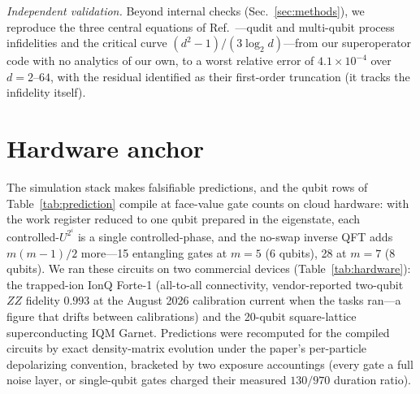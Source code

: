 \documentclass[aps,pra,reprint,superscriptaddress,nofootinbib,floatfix]{revtex4-2}
\begin{document}
\emph{Independent validation.} Beyond internal checks
(Sec.~\ref{sec:methods}), we reproduce the three central equations of
Ref.~\cite{jankovic2024}---qudit and multi-qubit process infidelities
and the critical curve $(d^2-1)/(3\log_2 d)$---from our superoperator
code with no analytics of our own, to a worst relative error of
$4.1\times10^{-4}$ over $d=2$--$64$, with the residual identified as
their first-order truncation (it tracks the infidelity itself).

\section{Hardware anchor}
\label{sec:hardware}

The simulation stack makes falsifiable predictions, and the qubit rows
of Table~\ref{tab:prediction} compile at face-value gate counts on
cloud hardware: with the work register reduced to one qubit prepared
in the eigenstate, each controlled-$U^{2^i}$ is a single
controlled-phase, and the no-swap inverse QFT adds $m(m-1)/2$
more---15 entangling gates at $m=5$ (6 qubits), 28 at $m=7$ (8
qubits). We ran these circuits on two commercial devices
(Table~\ref{tab:hardware}): the trapped-ion IonQ Forte-1
(all-to-all connectivity, vendor-reported two-qubit
$ZZ$ fidelity $0.993$ at the August 2026 calibration current when the
tasks ran---a figure that drifts between calibrations) and the
20-qubit square-lattice superconducting
IQM Garnet. Predictions were recomputed for the compiled circuits by
exact density-matrix evolution under the paper's per-particle
depolarizing convention, bracketed by two exposure accountings (every
gate a full noise layer, or single-qubit gates charged their measured
$130/970$ duration ratio).
\end{document}
